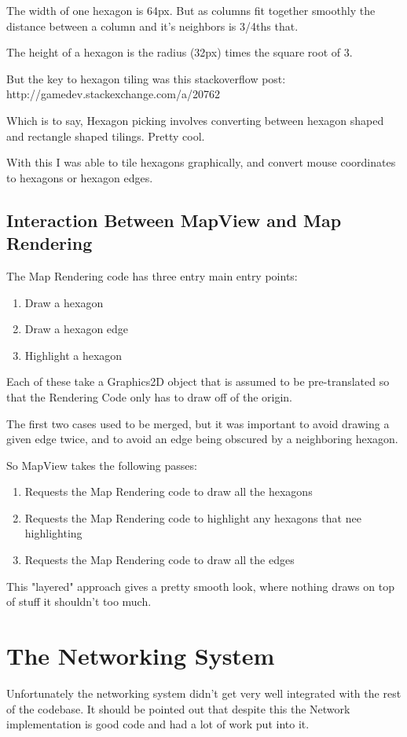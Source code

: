 \documentclass[12pt,a4paper]{article}
\begin{document}
The width of one hexagon is 64px. But as columns fit together
smoothly the distance between a column and it's neighbors is 3/4ths that.

The height of a hexagon is the radius (32px) times the square root of 3.

But the key to hexagon tiling was this stackoverflow post:
http://gamedev.stackexchange.com/a/20762 

Which is to say, Hexagon picking involves converting between hexagon shaped
and rectangle shaped tilings. Pretty cool.

With this I was able to tile hexagons graphically, and convert mouse coordinates
to hexagons or hexagon edges.

\subsection{Interaction Between MapView and Map Rendering}

The Map Rendering code has three entry main entry points:
\begin{enumerate}
\item{Draw a hexagon}
\item{Draw a hexagon edge}
\item{Highlight a hexagon}
\end{enumerate}

Each of these take a Graphics2D object that is assumed to be pre-translated so
that the Rendering Code only has to draw off of the origin.

The first two cases used to be merged, but it was important to avoid drawing a
given edge twice, and to avoid an edge being obscured by a neighboring hexagon.

So MapView takes the following passes:
\begin{enumerate}
\item{Requests the Map Rendering code to draw all the hexagons}
\item{Requests the Map Rendering code to highlight any hexagons that nee
      highlighting}
\item{Requests the Map Rendering code to draw all the edges}
\end{enumerate}

This "layered" approach gives a pretty smooth look, where nothing draws on top
of stuff it shouldn't too much.

\section{The Networking System}
Unfortunately the networking system didn't get very well integrated with the
rest of the codebase. It should be pointed out that despite this the Network
implementation is good code and had a lot of work put into it.
\end{document}
